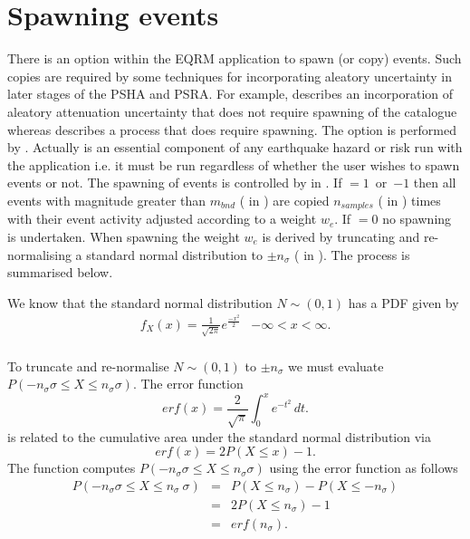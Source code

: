 \section{Spawning events}
\label{source:spawning}


There is an option within the EQRM application to spawn (or copy)
events. Such copies are required by some techniques for
incorporating aleatory uncertainty in later stages of the PSHA and
PSRA. For example,  describes an
incorporation of aleatory attenuation uncertainty that does not
require spawning of the catalogue whereas
 describes a process that does require
spawning.  The option is performed by .
Actually  is an essential component of
any earthquake hazard or risk run with the
 application i.e. it must be run
regardless of whether the user wishes to spawn events or not. The
spawning of events is controlled by 
in . If
\mbox{$ = 1$ or $-1$} then all
events with magnitude greater than $m_{bnd}$ (
in ) are copied $n_{samples}$
( in ) times with
their event activity adjusted according to a weight $w_e$. If
\mbox{$ = 0$} no spawning is
undertaken. When spawning the weight $w_e$ is derived by
truncating and re-normalising a standard normal distribution to
$\pm n_\sigma$ ( in ).
The process is summarised below.

We know that the standard normal distribution $ N \sim (0,1)$ has
a PDF given by
\begin{equation}
\begin{array}{lr}
f_X(x)=\frac{1}{\sqrt{2\pi}}e^{\frac{-x^2}{2}} & - \infty <x<
\infty.
\\
\end{array}
\end{equation}

To truncate and re-normalise $N \sim (0,1)$ to $\pm n_\sigma$ we
must evaluate $P(-n_\sigma \sigma \leq X \leq n_\sigma \sigma)$.
The error function
\begin{equation}
erf(x) = \frac{2}{\sqrt{\pi}} \int_{0}^{x} e^{-t^2} \, dt.
\end{equation}
is related to the cumulative area under the standard normal
distribution via
\begin{equation}
erf(x) = 2P(X \leq x)-1.
\end{equation}
The function  computes $P(-n_\sigma
\sigma \leq X \leq n_\sigma \sigma)$ using the error function as
follows
\begin{equation}
\begin{array}{rcl}
P(-n_\sigma \sigma \leq X \leq n_\sigma\ \sigma)  & = & P(X \leq
n_\sigma)-P(X \leq -n_\sigma) \\
   & = & 2P(X \leq n_\sigma)-1 \\
    & = & erf(n_\sigma) . \\
\end{array}
\end{equation}

